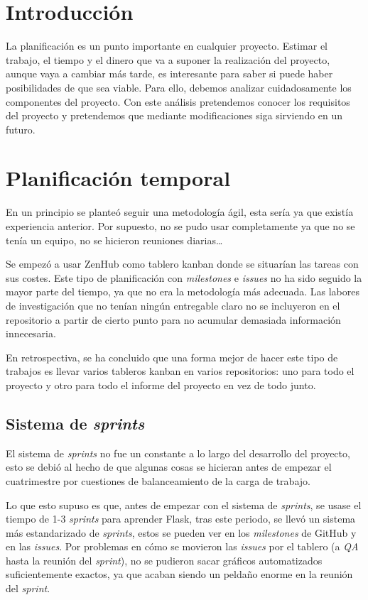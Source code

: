 
\section{Introducción}

La planificación es un punto importante en cualquier proyecto. Estimar el trabajo, el tiempo y el dinero que va a suponer la realización del proyecto, aunque vaya a cambiar más tarde, es interesante para saber si puede haber posibilidades de que sea viable. Para ello, debemos analizar cuidadosamente los componentes del proyecto. Con este análisis pretendemos conocer los requisitos del proyecto y pretendemos que mediante modificaciones siga sirviendo en un futuro.

\section{Planificación temporal}
En un principio se planteó seguir una metodología ágil, esta sería  ya que existía experiencia anterior. Por supuesto, no se pudo usar completamente ya que no se tenía un equipo, no se hicieron reuniones diarias\ldots

Se empezó a usar ZenHub como tablero kanban donde se situarían las tareas con sus costes. Este tipo de planificación con \emph{milestones} e \emph{issues} no ha sido seguido la mayor parte del tiempo, ya que no era la metodología más adecuada. Las labores de investigación que no tenían ningún entregable claro no se incluyeron en el repositorio a partir de cierto punto para no acumular demasiada información innecesaria.

En retrospectiva, se ha concluido que una forma mejor de hacer este tipo de trabajos es llevar varios tableros kanban en varios repositorios: uno para todo el proyecto y otro para todo el informe del proyecto en vez de todo junto.

\subsection{Sistema de \emph{sprints}}

El sistema de \emph{sprints} no fue un constante a lo largo del desarrollo del proyecto, esto se debió al hecho de que algunas cosas se hicieran antes de empezar el cuatrimestre por cuestiones de balanceamiento de la carga de trabajo.

Lo que esto supuso es que, antes de empezar con el sistema de \emph{sprints}, se usase el tiempo de 1-3 \emph{sprints} para aprender Flask, tras este periodo, se llevó un sistema más estandarizado de \emph{sprints}, estos se pueden ver en los \emph{milestones} de GitHub y en las \emph{issues}. Por problemas en cómo se movieron las \emph{issues} por el tablero (a \emph{QA} hasta la reunión del \emph{sprint}), no se pudieron sacar gráficos automatizados suficientemente exactos, ya que acaban siendo un peldaño enorme en la reunión del \emph{sprint}.

